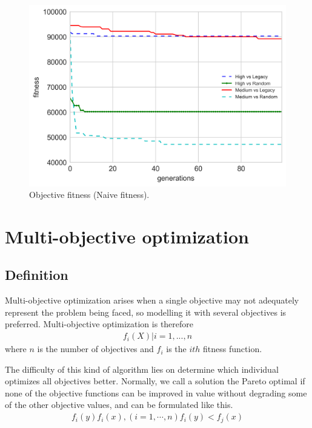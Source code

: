 \documentclass{llncs}
\begin{document}
\begin{figure}[H]
  \centering
    \includegraphics[width=1\textwidth]{so_fitness_bests}
    \caption{Objective fitness (Naive fitness).}
\end{figure}

%
\section{Multi-objective optimization}
\label{sec:sec3}
%

\subsection{Definition}

Multi-objective optimization arises when a single objective may not adequately represent the problem being faced, so modelling it with several objectives is preferred. Multi-objective optimization is therefore
\begin{equation}
\begin{aligned}
f_i(X) | i = 1,...,n
\end{aligned}
\end{equation}
where $n$ is the number of objectives and $f_i$ is the $ith$ fitness function.

The difficulty of this kind of algorithm lies on determine which individual optimizes all objectives better. Normally, we call a solution the Pareto optimal if none of the objective functions can be improved in value without degrading some of the other objective values, and can be formulated like this.\cite{cervigon}
\begin{equation}
\begin{aligned}
f_i(y) f_i(x), (i=1,\cdots,n) f_i(y) < f_j(x)
\end{aligned}
\end{equation}
\end{document}
